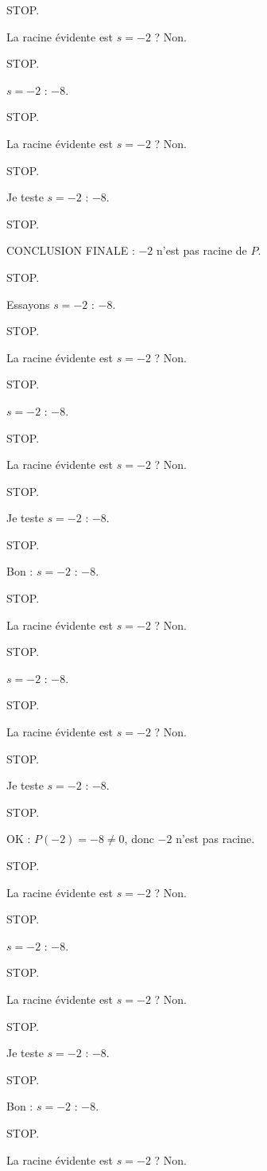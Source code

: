 \documentclass[11pt]{article}
\begin{document}
\begin{exoresolu}
\begin{enumerate}
STOP. 

La racine évidente est $s = -2$ ? Non. 

STOP. 

$s = -2$ : $-8$. 

STOP. 

La racine évidente est $s = -2$ ? Non. 

STOP. 

Je teste $s = -2$ : $-8$. 

STOP. 

CONCLUSION FINALE : $-2$ n'est pas racine de $P$. 

STOP. 

Essayons $s = -2$ : $-8$. 

STOP. 

La racine évidente est $s = -2$ ? Non. 

STOP. 

$s = -2$ : $-8$. 

STOP. 

La racine évidente est $s = -2$ ? Non. 

STOP. 

Je teste $s = -2$ : $-8$. 

STOP. 

Bon : $s = -2$ : $-8$. 

STOP. 

La racine évidente est $s = -2$ ? Non. 

STOP. 

$s = -2$ : $-8$. 

STOP. 

La racine évidente est $s = -2$ ? Non. 

STOP. 

Je teste $s = -2$ : $-8$. 

STOP. 

OK : $P(-2) = -8 \neq 0$, donc $-2$ n'est pas racine. 

STOP. 

La racine évidente est $s = -2$ ? Non. 

STOP. 

$s = -2$ : $-8$. 

STOP. 

La racine évidente est $s = -2$ ? Non. 

STOP. 

Je teste $s = -2$ : $-8$. 

STOP. 

Bon : $s = -2$ : $-8$. 

STOP. 

La racine évidente est $s = -2$ ? Non. 


\end{enumerate}
\end{exoresolu}
\end{document}
